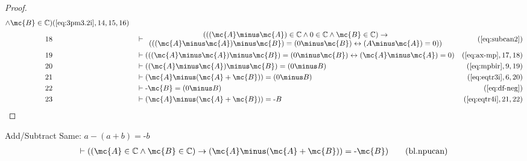 \begin{proof}
\begin{align}
     \wedge \mc{B} \in \mathbb{C}
     )&(\mbox{\ref{eq:3pm3.2i}},14,15,16)\notag
  \\ 18 &&  & \vdash 
     \begin{array}{c}
     ( ( ( \mc{A} \minus \mc{A} ) \in \mathbb{C} \wedge 0 \in \mathbb{C}
     \wedge \mc{B} \in \mathbb{C} ) \rightarrow \\
     ( ( ( \mc{A} \minus
     \mc{A} ) \minus \mc{B} ) = ( 0 \minus \mc{B} ) \leftrightarrow ( A
     \minus \mc{A} ) = 0 ) )
     \end{array}
     &(\mbox{\ref{eq:subcan2}})\notag
  \\ 19 &&  & \vdash ( ( ( \mc{A} \minus \mc{A} ) \minus \mc{B} ) = ( 0 \minus \mc{B} )
     \leftrightarrow ( \mc{A} \minus \mc{A} ) = 0
     )&(\mbox{\ref{eq:ax-mp}},17,18)\notag
  \\ 20 &&  & \vdash ( ( \mc{A} \minus \mc{A} ) \minus \mc{B} ) = ( 0 \minus B
     )&(\mbox{\ref{eq:mpbir}},9,19)\notag
  \\ 21 &&  & \vdash ( \mc{A} \minus ( \mc{A} + \mc{B} ) ) = ( 0 \minus B
     )&(\mbox{\ref{eq:eqtr3i}},6,20)\notag
  \\ 22 &&  & \vdash \textrm{-} \mc{B} = ( 0 \minus B
     )&(\mbox{\ref{eq:df-neg}})\notag
  \\ 23 &&  & \vdash ( \mc{A} \minus ( \mc{A} + \mc{B} ) ) = \textrm{-}
     B&(\mbox{\ref{eq:eqtr4i}},21,22)\notag
\end{align}
\end{proof}

\begin{lemma} {Add/Subtract Same: $a \minus ( a + b ) =
\textrm{-} b$}
\begin{align}
\vdash ( ( \mc{A} \in \mathbb{C} \wedge \mc{B} \in \mathbb{C} ) \rightarrow ( \mc{A} \minus (
    \mc{A} + \mc{B} ) ) = \textrm{-} \mc{B} )\label{eq:bl.npucan}\tag{bl.npucan}
\end{align}
\end{lemma}


